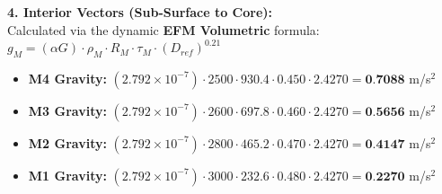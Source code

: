 \documentclass[11pt, a4paper]{article}
\begin{document}
  \vspace{0.5em}
  \noindent \textbf{4. Interior Vectors (Sub-Surface to Core):} \\[0.5em]
  \hspace*{1em} Calculated via the dynamic \textbf{EFM Volumetric} formula: $g_M = (\alpha G) \cdot \rho_{M} \cdot R_M \cdot \tau_M \cdot (D_{ref})^{0.21}$
  \begin{itemize}
    \item \textbf{M4 Gravity:} $(2.792 \times 10^{-7}) \cdot 2500 \cdot 930.4 \cdot 0.450 \cdot 2.4270 = \textbf{0.7088}$ m/s$^2$
    \item \textbf{M3 Gravity:} $(2.792 \times 10^{-7}) \cdot 2600 \cdot 697.8 \cdot 0.460 \cdot 2.4270 = \textbf{0.5656}$ m/s$^2$
    \item \textbf{M2 Gravity:} $(2.792 \times 10^{-7}) \cdot 2800 \cdot 465.2 \cdot 0.470 \cdot 2.4270 = \textbf{0.4147}$ m/s$^2$
    \item \textbf{M1 Gravity:} $(2.792 \times 10^{-7}) \cdot 3000 \cdot 232.6 \cdot 0.480 \cdot 2.4270 = \textbf{0.2270}$ m/s$^2$
  \end{itemize}
\end{document}
